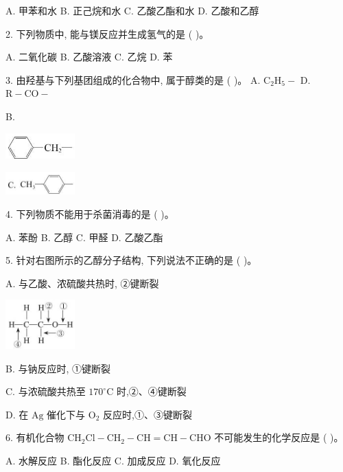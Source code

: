 \documentclass[10pt]{article}
\begin{document}
A. 甲苯和水 B. 正己烷和水 C. 乙酸乙酯和水 D. 乙酸和乙醇

2. 下列物质中, 能与镁反应并生成氢气的是 ( )。

A. 二氧化碳 B. 乙酸溶液 C. 乙烷 D. 苯

3. 由羟基与下列基团组成的化合物中, 属于醇类的是 ( )。 A. \({\mathrm{C}}_{2}{\mathrm{H}}_{5} -\) D. \(\mathrm{R} - \mathrm{{CO}} -\)

B.

\begin{center}
\includegraphics[max width=0.2\textwidth]{images/0190efc5-b58a-7c43-bfb0-e0a030df9cfd_100_636703.jpg}
\end{center}

\begin{center}
\includegraphics[max width=0.2\textwidth]{images/0190efc5-b58a-7c43-bfb0-e0a030df9cfd_100_331423.jpg}
\end{center}

4. 下列物质不能用于杀菌消毒的是 ( )。

A. 苯酚 B. 乙醇 C. 甲醛 D. 乙酸乙酯

5. 针对右图所示的乙醇分子结构, 下列说法不正确的是 ( )。

A. 与乙酸、浓硫酸共热时, ②键断裂

\begin{center}
\includegraphics[max width=0.2\textwidth]{images/0190efc5-b58a-7c43-bfb0-e0a030df9cfd_100_638178.jpg}
\end{center}

B. 与钠反应时, ①键断裂

C. 与浓硫酸共热至 \({170}^{ \circ }\mathrm{C}\) 时,②、④键断裂

D. 在 \(\mathrm{{Ag}}\) 催化下与 \({\mathrm{O}}_{2}\) 反应时,①、③键断裂

6. 有机化合物 \({\mathrm{{CH}}}_{2}\mathrm{{Cl}} - {\mathrm{{CH}}}_{2} - \mathrm{{CH}} = \mathrm{{CH}} - \mathrm{{CHO}}\) 不可能发生的化学反应是 ( )。

A. 水解反应 B. 酯化反应 C. 加成反应 D. 氧化反应
\end{document}

